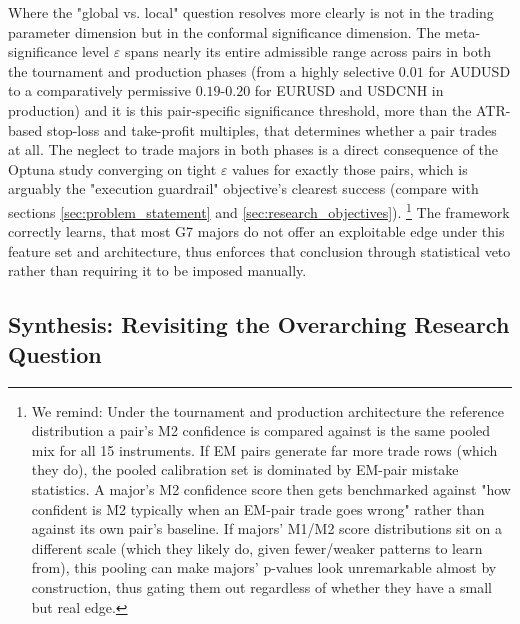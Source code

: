 \documentclass[12pt, a4paper]{article}
\begin{document}
\medskip

Where the "global vs. local" question resolves more clearly is not in the trading parameter dimension but in the conformal significance dimension. The meta-significance level 
$\varepsilon$ spans nearly its entire admissible range across pairs in both the tournament and production phases (from a highly selective $0.01$ for AUDUSD to a comparatively 
permissive $0.19$-$0.20$ for EURUSD and USDCNH in production) and it is this pair-specific significance threshold, more than the ATR-based stop-loss and take-profit multiples, 
that determines whether a pair trades at all. The neglect to trade majors in both phases is a direct consequence of the Optuna study converging on tight $\varepsilon$ values 
for exactly those pairs, which is arguably the "execution guardrail" objective's clearest success (compare with sections \ref{sec:problem_statement} and \ref{sec:research_objectives}).
\footnote{We remind: Under the tournament and production architecture the reference distribution a pair's M2 confidence is compared against is the same pooled mix for 
all 15 instruments. If EM pairs generate far more trade rows (which they do), the pooled calibration set is dominated by EM-pair mistake statistics. A major's M2 confidence score 
then gets benchmarked against "how confident is M2 typically when an EM-pair trade goes wrong" rather than against its own pair's baseline. 
If majors' M1/M2 score distributions sit on a different scale (which they likely do, given fewer/weaker patterns to learn from), this pooling can make majors' p-values look 
unremarkable almost by construction, thus gating them out regardless of whether they have a small but real edge.} 
The framework correctly learns, that most G7 majors do not offer an exploitable edge under this feature set and architecture, thus enforces that conclusion through statistical veto 
rather than requiring it to be imposed manually.


\subsection{Synthesis: Revisiting the Overarching Research Question}
\end{document}
